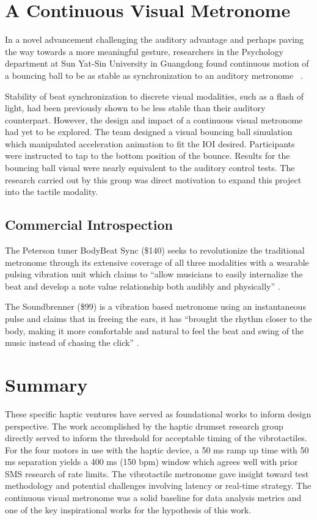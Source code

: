 \section{A Continuous Visual Metronome} \label{visualMet}
In a novel advancement challenging the auditory advantage and perhaps paving the way towards a more meaningful gesture, researchers in the Psychology department at Sun Yat-Sin University in Guangdong found continuous motion of a bouncing ball to be as stable as synchronization to an auditory metronome
~\cite{gan2015synchronization}.

Stability of beat synchronization to discrete visual modalities, such as a flash of light, had been previously shown to be less stable than their auditory counterpart. However, the design and impact of a continuous visual metronome had yet to be explored. The team designed a visual bouncing ball simulation which manipulated acceleration animation to fit the IOI desired. Participants were instructed to tap to the bottom position of the bounce. Results for the bouncing ball visual were nearly equivalent to the auditory control tests. The research carried out by this group was direct motivation to expand this project into the tactile modality.

\subsection{Commercial Introspection} \label{commercial}
The Peterson tuner BodyBeat Sync (\$140) seeks to revolutionize the traditional metronome through its extensive coverage of all three modalities with a wearable pulsing vibration unit which claims to “allow musicians to easily internalize the beat and develop a note value relationship both audibly and physically” \cite{Peterson}.

The Soundbrenner (\$99) is a vibration based metronome using an instantaneous pulse and claims that in freeing the ears, it has “brought the rhythm closer to the body, making it more comfortable and natural to feel the beat and swing of the music instead of chasing the click” \cite{Soundbrenner}.

\section{Summary}
These specific haptic ventures have served as foundational works to inform design perspective. The work accomplished by the haptic drumset research group directly served to inform the threshold for acceptable timing of the vibrotactiles. For the four motors in use with the haptic device, a 50 ms ramp up time with 50 ms separation yields a 400 ms (150 bpm) window which agrees well with prior SMS research of rate limits. The vibrotactile metronome gave insight toward test methodology and potential challenges involving latency or real-time strategy. The continuous visual metronome was a solid baseline for data analysis metrics and one of the key inspirational works for the hypothesis of this work.